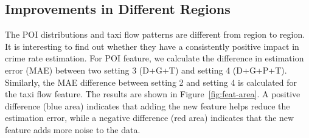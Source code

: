 {\begin{table}[h]
\centering
\caption{The coefficients of the top-6 features over different years. There are 21 different features in total. We only show the top-3 features with the highest positive/negative coefficients, respectively.}
\label{tb:fea-stability}
\end{table}
}


\subsection{Improvements in Different Regions}

The POI distributions and taxi flow patterns are different from region to region. It is interesting to find out whether they have a consistently positive impact in crime rate estimation. For POI feature, we calculate the difference in estimation error (MAE) between two setting 3 (D+G+T) and setting 4 (D+G+P+T). Similarly, the MAE difference between setting 2 and setting 4 is calculated for the taxi flow feature. The results are shown in Figure~\ref{fig:feat-area}.  A positive difference (blue area) indicates that adding the new feature helps reduce the estimation error, while a negative difference (red area) indicates that the new feature adds more noise to the data.  

